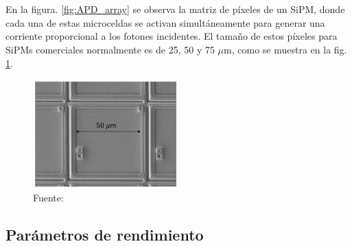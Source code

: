 \\ \\
En la figura. \ref{fig:APD_array} se observa la matriz de píxeles de un SiPM, donde cada una de estas microceldas se activan simultáneamente para generar una corriente proporcional a los fotones incidentes. El tamaño de estos píxeles para SiPMs comerciales normalmente es de 25, 50 y 75 $\mu$m, como se muestra en la fig. \ref{fig:APD_pitch}.     
\begin{figure}[h!]
\begin{centering}
    \caption{Microcelda (píxel) de un SiPM, donde se observa el área fotosensible y la resistencia de apagado al rededor de esta. Adaptado de \footcite{MPPC_note}.}
    \includegraphics[width=0.5\textwidth]{Images/SiPM_pixel.PNG}
    \caption*{Fuente:}
    \label{fig:APD_pitch}  
  \par\end{centering}
\end{figure}

\subsection{Parámetros de rendimiento}
